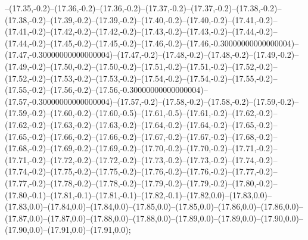 --(17.35,-0.2)--(17.36,-0.2)--(17.36,-0.2)--(17.37,-0.2)--(17.37,-0.2)--(17.38,-0.2)--(17.38,-0.2)--(17.39,-0.2)--(17.39,-0.2)--(17.40,-0.2)--(17.40,-0.2)--(17.41,-0.2)--(17.41,-0.2)--(17.42,-0.2)--(17.42,-0.2)--(17.43,-0.2)--(17.43,-0.2)--(17.44,-0.2)--(17.44,-0.2)--(17.45,-0.2)--(17.45,-0.2)--(17.46,-0.2)--(17.46,-0.30000000000000004)--(17.47,-0.30000000000000004)--(17.47,-0.2)--(17.48,-0.2)--(17.48,-0.2)--(17.49,-0.2)--(17.49,-0.2)--(17.50,-0.2)--(17.50,-0.2)--(17.51,-0.2)--(17.51,-0.2)--(17.52,-0.2)--(17.52,-0.2)--(17.53,-0.2)--(17.53,-0.2)--(17.54,-0.2)--(17.54,-0.2)--(17.55,-0.2)--(17.55,-0.2)--(17.56,-0.2)--(17.56,-0.30000000000000004)--(17.57,-0.30000000000000004)--(17.57,-0.2)--(17.58,-0.2)--(17.58,-0.2)--(17.59,-0.2)--(17.59,-0.2)--(17.60,-0.2)--(17.60,-0.5)--(17.61,-0.5)--(17.61,-0.2)--(17.62,-0.2)--(17.62,-0.2)--(17.63,-0.2)--(17.63,-0.2)--(17.64,-0.2)--(17.64,-0.2)--(17.65,-0.2)--(17.65,-0.2)--(17.66,-0.2)--(17.66,-0.2)--(17.67,-0.2)--(17.67,-0.2)--(17.68,-0.2)--(17.68,-0.2)--(17.69,-0.2)--(17.69,-0.2)--(17.70,-0.2)--(17.70,-0.2)--(17.71,-0.2)--(17.71,-0.2)--(17.72,-0.2)--(17.72,-0.2)--(17.73,-0.2)--(17.73,-0.2)--(17.74,-0.2)--(17.74,-0.2)--(17.75,-0.2)--(17.75,-0.2)--(17.76,-0.2)--(17.76,-0.2)--(17.77,-0.2)--(17.77,-0.2)--(17.78,-0.2)--(17.78,-0.2)--(17.79,-0.2)--(17.79,-0.2)--(17.80,-0.2)--(17.80,-0.1)--(17.81,-0.1)--(17.81,-0.1)--(17.82,-0.1)--(17.82,0.0)--(17.83,0.0)--(17.83,0.0)--(17.84,0.0)--(17.84,0.0)--(17.85,0.0)--(17.85,0.0)--(17.86,0.0)--(17.86,0.0)--(17.87,0.0)--(17.87,0.0)--(17.88,0.0)--(17.88,0.0)--(17.89,0.0)--(17.89,0.0)--(17.90,0.0)--(17.90,0.0)--(17.91,0.0)--(17.91,0.0);